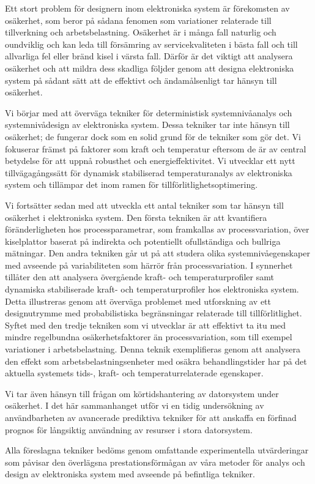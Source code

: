 Ett stort problem för designern inom elektroniska system är förekomsten av
osäkerhet, som beror på sådana fenomen som variationer relaterade till
tillverkning och arbetsbelastning. Osäkerhet är i många fall naturlig och
oundviklig och kan leda till försämring av servicekvaliteten i bästa fall och
till allvarliga fel eller bränd kisel i värsta fall. Därför är det viktigt att
analysera osäkerhet och att mildra dess skadliga följder genom att designa
elektroniska system på sådant sätt att de effektivt och ändamålsenligt tar
hänsyn till osäkerhet.

Vi börjar med att överväga tekniker för deterministisk systemnivåanalys och
systemnivådesign av elektroniska system. Dessa tekniker tar inte hänsyn till
osäkerhet; de fungerar dock som en solid grund för de tekniker som gör det. Vi
fokuserar främst på faktorer som kraft och temperatur eftersom de är av central
betydelse för att uppnå robusthet och energieffektivitet. Vi utvecklar ett nytt
tillvägagångssätt för dynamisk stabiliserad temperaturanalys av elektroniska
system och tillämpar det inom ramen för tillförlitlighetsoptimering.

Vi fortsätter sedan med att utveckla ett antal tekniker som tar hänsyn till
osäkerhet i elektroniska system. Den första tekniken är att kvantifiera
föränderligheten hos processparametrar, som framkallas av processvariation, över
kiselplattor baserat på indirekta och potentiellt ofullständiga och bullriga
mätningar. Den andra tekniken går ut på att studera olika systemnivåegenskaper
med avseende på variabiliteten som härrör från processvariation. I synnerhet
tillåter den att analysera övergående kraft- och temperaturprofiler samt
dynamiska stabiliserade kraft- och temperaturprofiler hos elektroniska system.
Detta illustreras genom att överväga problemet med utforskning av ett
designutrymme med probabilistiska begränsningar relaterade till
tillförlitlighet. Syftet med den tredje tekniken som vi utvecklar är att
effektivt ta itu med mindre regelbundna osäkerhetsfaktorer än processvariation,
som till exempel variationer i arbetsbelastning. Denna teknik exemplifieras
genom att analysera den effekt som arbetsbelastningsenheter med osäkra
behandlingstider har på det aktuella systemets tids-, kraft- och
temperaturrelaterade egenskaper.

Vi tar även hänsyn till frågan om körtidshantering av datorsystem under
osäkerhet. I det här sammanhanget utför vi en tidig undersökning av
användbarheten av avancerade prediktiva tekniker för att anskaffa en förfinad
prognos för långsiktig användning av resurser i stora datorsystem.

Alla föreslagna tekniker bedöms genom omfattande experimentella utvärderingar
som påvisar den överlägsna prestationsförmågan av våra metoder för analys och
design av elektroniska system med avseende på befintliga tekniker.

